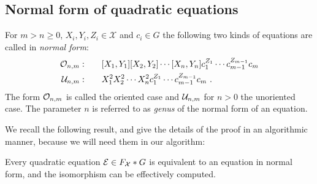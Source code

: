 \documentclass[a4paper,11pt]{amsart}
\begin{document}
\subsection{Normal form of quadratic equations} \label{sec:normal_form}
\begin{defi}
  For $m>n\ge0$, $X_i,Y_i,Z_i \in\mathcal{X}$ and $c_i \in G$ the following two kinds of
  equations are called in \emph{normal form}:
 \begin{align}
  \mathcal{O}_{n,m}:\qquad & [X_1,Y_1][X_2,Y_2]\cdots[X_n,Y_n]c_1^{Z_1}\cdots c_{m-1}^{Z_{m-1}}c_m  \\
   \mathcal{\mathcal{U}}_{n,m}:\qquad & X_1^2X_2^2\cdots X_n^2 c_1^{Z_1}\cdots c_{m-1}^{Z_{m-1}}c_m\ .
 \end{align} 
 The form $\mathcal{O}_{n,m}$ is called the oriented case and $\mathcal{U}_{n,m}$ for
 $n>0$ the unoriented case.  The parameter $n$ is referred to as
 \emph{genus} of the normal form of an equation.
\end{defi}

We recall the following result, and 
give the details of the proof in an algorithmic manner, because we will need them in our algorithm:
\begin{thm} \label{Thm:equationNormalForm}
  Every quadratic equation $\mathcal{E} \in F_{\mathcal{X}}*G$ is equivalent to an equation
  in normal form, and the isomorphism can be effectively computed.
\end{thm}
\end{document}
